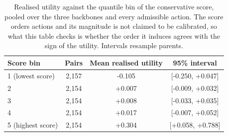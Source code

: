 \documentclass{article}
\begin{document}
\begin{table}[h]
  \caption{Operating points over the penalty grid, with the neighbourhood size frozen at the
  selected value on each backbone. Intervention rate is the share of requests on which a
  non-reference action ran, and conditional HIR is the share of those that raised the loss.
  Raising the penalty moves the rate and leaves the conditional rate close to where it was, so
  what the rule controls is how often it acts rather than how often an executed action hurts.}
  \label{tab:app-operating}
  \centering
  \small
  \setlength{\tabcolsep}{4pt}
\end{table}

\begin{table}[h]
  \caption{Realised utility against the quantile bin of the conservative score, pooled over the
  three backbones and every admissible action. The score orders actions and its magnitude is
  not claimed to be calibrated, so what this table checks is whether the order it induces
  agrees with the sign of the utility. Intervals resample parents.}
  \label{tab:app-scorebins}
  \centering
  \small
  \setlength{\tabcolsep}{4pt}
\begin{tabular}{lccc}
    \toprule
    Score bin & Pairs & Mean realised utility & 95\% interval \\
    \midrule
    1 (lowest score) & 2,157 & -0.105 & [-0.250, +0.047] \\
    2 & 2,154 & +0.007 & [-0.009, +0.032] \\
    3 & 2,154 & +0.008 & [-0.033, +0.035] \\
    4 & 2,154 & +0.017 & [-0.007, +0.052] \\
    5 (highest score) & 2,154 & +0.304 & [+0.058, +0.788] \\
    \bottomrule
  \end{tabular}
\end{table}
\end{document}
